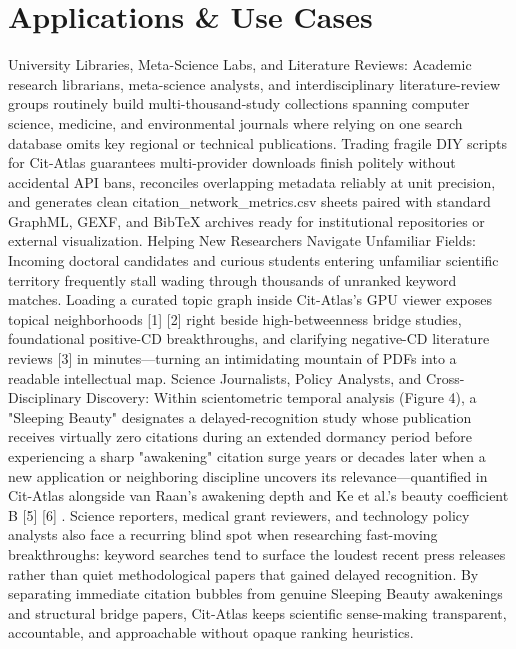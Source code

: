 \documentclass[10pt,letterpaper]{article}
\begin{document}
\section{Applications \& Use Cases}
University Libraries, Meta-Science Labs, and Literature Reviews: Academic research librarians, meta-science analysts, and interdisciplinary literature-review groups routinely build multi-thousand-study collections spanning computer science, medicine, and environmental journals where relying on one search database omits key regional or technical publications. Trading fragile DIY scripts for Cit-Atlas guarantees multi-provider downloads finish politely without accidental API bans, reconciles overlapping metadata reliably at unit precision, and generates clean citation\_network\_metrics.csv sheets paired with standard GraphML, GEXF, and BibTeX archives ready for institutional repositories or external visualization. Helping New Researchers Navigate Unfamiliar Fields: Incoming doctoral candidates and curious students entering unfamiliar scientific territory frequently stall wading through thousands of unranked keyword matches. Loading a curated topic graph inside Cit-Atlas's GPU viewer exposes topical neighborhoods [1] [2] right beside high-betweenness bridge studies, foundational positive-CD breakthroughs, and clarifying negative-CD literature reviews [3] in minutes---turning an intimidating mountain of PDFs into a readable intellectual map. Science Journalists, Policy Analysts, and Cross-Disciplinary Discovery: Within scientometric temporal analysis (Figure 4), a "Sleeping Beauty" designates a delayed-recognition study whose publication receives virtually zero citations during an extended dormancy period before experiencing a sharp "awakening" citation surge years or decades later when a new application or neighboring discipline uncovers its relevance---quantified in Cit-Atlas alongside van Raan's awakening depth and Ke et al.'s beauty coefficient B [5] [6] . Science reporters, medical grant reviewers, and technology policy analysts also face a recurring blind spot when researching fast-moving breakthroughs: keyword searches tend to surface the loudest recent press releases rather than quiet methodological papers that gained delayed recognition. By separating immediate citation bubbles from genuine Sleeping Beauty awakenings and structural bridge papers, Cit-Atlas keeps scientific sense-making transparent, accountable, and approachable without opaque ranking heuristics.
\end{document}
